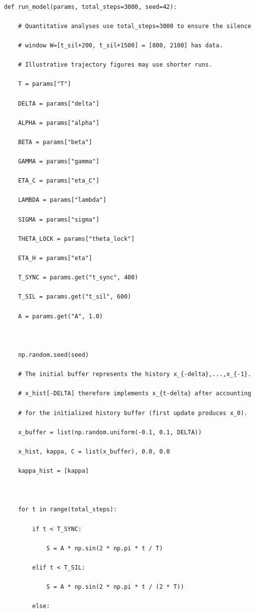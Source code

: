 \documentclass[12pt,a4paper]{article}
\begin{document}
{\small

\begin{verbatim}

def run_model(params, total_steps=3000, seed=42):

    # Quantitative analyses use total_steps=3000 to ensure the silence

    # window W=[t_sil+200, t_sil+1500] = [800, 2100] has data.

    # Illustrative trajectory figures may use shorter runs.

    T = params["T"]

    DELTA = params["delta"]

    ALPHA = params["alpha"]

    BETA = params["beta"]

    GAMMA = params["gamma"]

    ETA_C = params["eta_C"]

    LAMBDA = params["lambda"]

    SIGMA = params["sigma"]

    THETA_LOCK = params["theta_lock"]

    ETA_H = params["eta"]

    T_SYNC = params.get("t_sync", 400)

    T_SIL = params.get("t_sil", 600)

    A = params.get("A", 1.0)



    np.random.seed(seed)

    # The initial buffer represents the history x_{-delta},...,x_{-1}.

    # x_hist[-DELTA] therefore implements x_{t-delta} after accounting

    # for the initialized history buffer (first update produces x_0).

    x_buffer = list(np.random.uniform(-0.1, 0.1, DELTA))

    x_hist, kappa, C = list(x_buffer), 0.0, 0.0

    kappa_hist = [kappa]



    for t in range(total_steps):

        if t < T_SYNC:

            S = A * np.sin(2 * np.pi * t / T)

        elif t < T_SIL:

            S = A * np.sin(2 * np.pi * t / (2 * T))

        else:


\end{verbatim}}
\end{document}
